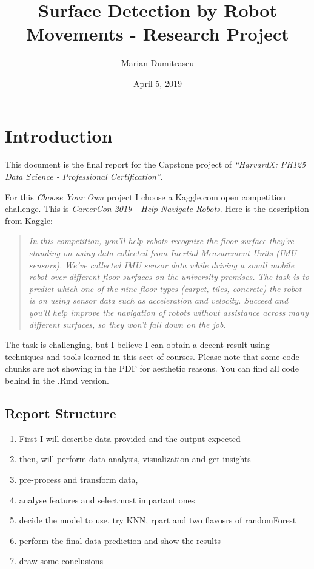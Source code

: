 \documentclass[]{article}
\title{Surface Detection by Robot Movements - Research Project}
\author{Marian Dumitrascu}
\date{April 5, 2019}
\providecommand{\tightlist}{%
  \setlength{\itemsep}{0pt}\setlength{\parskip}{0pt}}
\begin{document}
\maketitle

\hypertarget{introduction}{%
\section{Introduction}\label{introduction}}

This document is the final report for the Capstone project of
\emph{``HarvardX: PH125 Data Science - Professional Certification''}.

For this \emph{Choose Your Own} project I choose a Kaggle.com open
competition challenge. This is
\href{https://www.kaggle.com/c/career-con-2019}{\emph{CareerCon 2019 -
Help Navigate Robots}}. Here is the description from Kaggle:

\begin{quote}
\emph{In this competition, you'll help robots recognize the floor
surface they're standing on using data collected from Inertial
Measurement Units (IMU sensors).} \emph{We've collected IMU sensor data
while driving a small mobile robot over different floor surfaces on the
university premises. The task is to predict which one of the nine floor
types (carpet, tiles, concrete) the robot is on using sensor data such
as acceleration and velocity. Succeed and you'll help improve the
navigation of robots without assistance across many different surfaces,
so they won't fall down on the job.}
\end{quote}

The task is challenging, but I believe I can obtain a decent result
using techniques and tools learned in this seet of courses. Please note
that some code chunks are not showing in the PDF for aesthetic reasons.
You can find all code behind in the .Rmd version.

\hypertarget{report-structure}{%
\subsection{Report Structure}\label{report-structure}}

\begin{enumerate}
\def\labelenumi{\arabic{enumi}.}
\tightlist
\item
  First I will describe data provided and the output expected
\item
  then, will perform data analysis, visualization and get insights
\item
  pre-process and transform data,
\item
  analyse features and selectmost impartant ones
\item
  decide the model to use, try KNN, rpart and two flavosrs of
  randomForest
\item
  perform the final data prediction and show the results
\item
  draw some conclusions
\end{enumerate}
\end{document}
